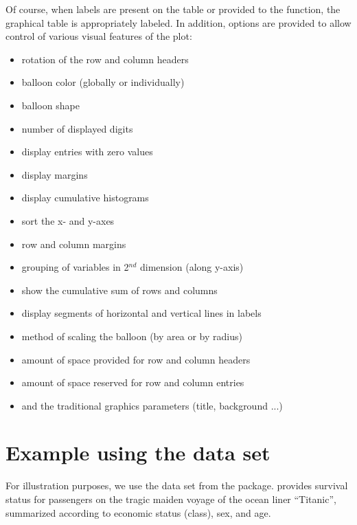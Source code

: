 \documentclass[a4paper]{report}
\begin{document}
\begin{article}
Of course, when labels are present on the table or provided to the
function, the graphical table is appropriately labeled.  In
addition, options are provided to allow control of various visual features
of the plot:

\begin{itemize}
  \item rotation of the row and column headers
  \item balloon color (globally or individually) 
  \item balloon shape 
  \item number of displayed digits
  \item display entries with zero values
  \item display margins
  \item display cumulative histograms
  \item sort the x- and y-axes
  \item row and column margins 
  \item grouping of variables in 2$^{nd}$ dimension (along y-axis) 
  \item show the cumulative sum of rows and columns
  \item display segments of horizontal and vertical lines in labels
  \item method of scaling the balloon (by area or by radius)
  \item amount of space provided for row and column headers
  \item amount of space reserved for row and column entries
  \item and the traditional graphics parameters (title, background ...)
\end{itemize}

\section*{Example using the  data set}

For illustration purposes, we use the  data set from
the  package.   provides survival status
for passengers on the tragic maiden voyage of the ocean liner
``Titanic'', summarized according to economic status (class), sex, and
age.





\end{article}
\end{document}
